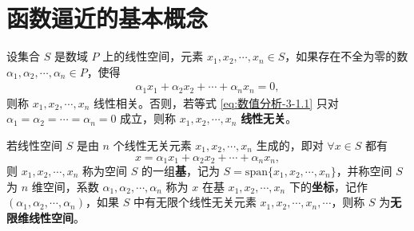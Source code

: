 \documentclass[../../main.tex]{subfiles}
\begin{document}
\section{函数逼近的基本概念}

\begin{definition}
设集合 \( S \) 是数域 \( P \) 上的线性空间，元素 \( x_1, x_2, \cdots, x_n \in S \)，如果存在不全为零的数 \( \alpha_1, \alpha_2, \cdots, \alpha_n \in P \)，使得
\begin{align}
\alpha_1 x_1 + \alpha_2 x_2 + \cdots + \alpha_n x_n = 0, \label{eq:数值分析-3-1.1}
\end{align}
则称 \( x_1, x_2, \cdots, x_n \) 线性相关。否则，若等式 \eqref{eq:数值分析-3-1.1} 只对 \( \alpha_1 = \alpha_2 = \cdots = \alpha_n = 0 \) 成立，则称 \( x_1, x_2, \cdots, x_n \) \textbf{线性无关}。

若线性空间 \( S \) 是由 \( n \) 个线性无关元素 \( x_1, x_2, \cdots, x_n \) 生成的，即对 \( \forall x \in S \) 都有
\[
x = \alpha_1 x_1 + \alpha_2 x_2 + \cdots + \alpha_n x_n,
\]
则 \( x_1, x_2, \cdots, x_n \) 称为空间 \( S \) 的一组\textbf{基}，记为 \( S = \text{span}\{x_1, x_2, \cdots, x_n\} \)，并称空间 \( S \) 为 \( n \) 维空间，系数 \( \alpha_1, \alpha_2, \cdots, \alpha_n \) 称为 \( x \) 在基 \( x_1, x_2, \cdots, x_n \) 下的\textbf{坐标}，记作 \( (\alpha_1, \alpha_2, \cdots, \alpha_n) \)，如果 \( S \) 中有无限个线性无关元素 \( x_1, x_2, \cdots, x_n, \cdots \)，则称 \( S \) 为\textbf{无限维线性空间}。
\end{definition}
\end{document}
